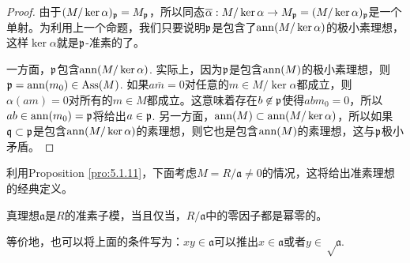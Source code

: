 \begin{proof}
	由于$(M/\ker\alpha)_{\mathfrak{p}}=M_{\mathfrak{p}}$，所以同态$\overline{\alpha}:M/\ker\alpha\to M_{\mathfrak{p}}=(M/\ker\alpha)_{\mathfrak{p}}$是一个单射。为利用上一个命题，我们只要说明$\mathfrak{p}$是包含了$\operatorname{ann}(M/\ker \alpha)$的极小素理想，这样$\ker \alpha$就是$\mathfrak{p}$-准素的了。

	一方面，$\mathfrak{p}$包含$\operatorname{ann}(M/\ker \alpha)$. 实际上，因为$\mathfrak{p}$是包含$\operatorname{ann}(M)$的极小素理想，则$\mathfrak{p}=\operatorname{ann}(m_0)\in \operatorname{Ass}(M)$. 如果$a\overline{m}=0$对任意的$m\in M/\ker \alpha$都成立，则$\alpha(am)=0$对所有的$m\in M$都成立。这意味着存在$b\not\in \mathfrak{p}$使得$abm_0=0$，所以$ab\in \operatorname{ann}(m_0)=\mathfrak{p}$将给出$a\in \mathfrak{p}$. 另一方面，$\operatorname{ann}(M)\subset \operatorname{ann}(M/\ker \alpha)$，所以如果$\mathfrak q\subset \mathfrak{p}$是包含$\operatorname{ann}(M/\ker \alpha)$的素理想，则它也是包含$\operatorname{ann}(M)$的素理想，这与$\mathfrak{p}$极小矛盾。
\end{proof}




利用Proposition \ref{pro:5.1.11}，下面考虑$M=R/\mathfrak{a}\neq 0$的情况，这将给出准素理想的经典定义。

\begin{pro}
真理想$\mathfrak{a}$是$R$的准素子模，当且仅当，$R/\mathfrak{a}$中的零因子都是幂零的。
\end{pro}

等价地，也可以将上面的条件写为：$xy\in \mathfrak{a}$可以推出$x\in \mathfrak{a}$或者$y\in \sqrt\mathfrak{a}$.

